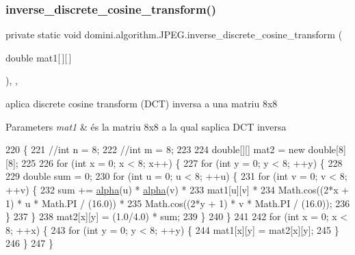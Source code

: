 \subsubsection{\texorpdfstring{inverse\+\_\+discrete\+\_\+cosine\+\_\+transform()}{inverse\_discrete\_cosine\_transform()}}
{\footnotesize\ttfamily private static void domini.\+algorithm.\+J\+P\+E\+G.\+inverse\+\_\+discrete\+\_\+cosine\+\_\+transform (\begin{DoxyParamCaption}\item[{double}]{mat1\mbox{[}$\,$\mbox{]}\mbox{[}$\,$\mbox{]} }\end{DoxyParamCaption})\hspace{0.3cm}{\ttfamily [inline]}, {\ttfamily [static]}, {\ttfamily [private]}}



aplica discrete cosine transform (D\+CT) inversa a una matriu 8x8 


\begin{DoxyParams}{Parameters}
{\em mat1} & és la matriu 8x8 a la qual s\textquotesingle{}aplica D\+CT inversa \\
\hline
\end{DoxyParams}

\begin{DoxyCode}
220                                                                            \{
221         \textcolor{comment}{//int n = 8;}
222         \textcolor{comment}{//int m = 8;}
223         
224         \textcolor{keywordtype}{double}[][] mat2 = \textcolor{keyword}{new} \textcolor{keywordtype}{double}[8][8];
225 
226         \textcolor{keywordflow}{for} (\textcolor{keywordtype}{int} x = 0; x < 8; x++) \{
227             \textcolor{keywordflow}{for} (\textcolor{keywordtype}{int} y = 0; y < 8; ++y) \{
228 
229                 \textcolor{keywordtype}{double} sum = 0;
230                 \textcolor{keywordflow}{for} (\textcolor{keywordtype}{int} u = 0; u < 8; ++u) \{ 
231                     \textcolor{keywordflow}{for} (\textcolor{keywordtype}{int} v = 0; v < 8; ++v)  \{ 
232                         sum += \hyperlink{classdomini_1_1algorithm_1_1JPEG_a058b0ee7eb44bbaec4078b5fc32c5107}{alpha}(u) * \hyperlink{classdomini_1_1algorithm_1_1JPEG_a058b0ee7eb44bbaec4078b5fc32c5107}{alpha}(v) * 
233                                mat1[u][v] *  
234                                Math.cos((2*x + 1) * u * Math.PI / (16.0)) *  
235                                Math.cos((2*y + 1) * v * Math.PI / (16.0)); 
236                     \} 
237                 \}
238                 mat2[x][y] = (1.0/4.0) * sum;
239             \}
240         \}
241 
242         \textcolor{keywordflow}{for} (\textcolor{keywordtype}{int} x = 0; x < 8; ++x) \{
243             \textcolor{keywordflow}{for} (\textcolor{keywordtype}{int} y = 0; y < 8; ++y) \{ 
244                 mat1[x][y] = mat2[x][y];
245             \}
246         \}
247     \}
\end{DoxyCode}
\mbox{\label{classdomini_1_1algorithm_1_1JPEG_a860d6166ef8edc40b0ffb61942589e5d}} 
